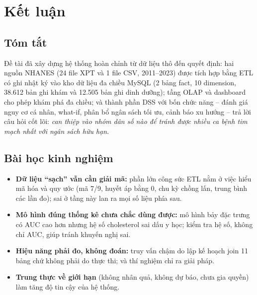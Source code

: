 \chapter{Kết luận}\label{ch:conclusion}

\section{Tóm tắt}
Đề tài đã xây dựng hệ thống hoàn chỉnh từ dữ liệu thô đến quyết định: hai nguồn NHANES (24 file XPT và 1 file CSV, 2011--2023) được tích hợp bằng ETL có ghi nhật ký vào kho dữ liệu đa chiều MySQL (2 bảng fact, 10 dimension, 38.612 bản ghi khám và 12.505 bản ghi dinh dưỡng); tầng OLAP và dashboard cho phép khám phá đa chiều; và thành phần DSS với bốn chức năng -- đánh giá nguy cơ cá nhân, what-if, phân bổ ngân sách tối ưu, cảnh báo xu hướng -- trả lời câu hỏi cốt lõi: \emph{can thiệp vào nhóm dân số nào để tránh được nhiều ca bệnh tim mạch nhất với ngân sách hữu hạn}.

\section{Bài học kinh nghiệm}
\begin{itemize}
\item \textbf{Dữ liệu ``sạch'' vẫn cần giải mã:} phần lớn công sức ETL nằm ở việc hiểu mã hóa và quy ước (mã 7/9, huyết áp bằng 0, chu kỳ chồng lấn, trung bình các lần đo); sai ở tầng này lan ra mọi số liệu phía sau.
\item \textbf{Mô hình đúng thống kê chưa chắc dùng được:} mô hình bảy đặc trưng có AUC cao hơn nhưng hệ số cholesterol sai dấu y học; kiểm tra hệ số, không chỉ AUC, giúp tránh khuyến nghị sai.
\item \textbf{Hiệu năng phải đo, không đoán:} truy vấn chậm do lập kế hoạch join 11 bảng chứ không phải do thực thi;  và thí nghiệm chỉ ra giải pháp.
\item \textbf{Trung thực về giới hạn} (không nhân quả, không dự báo, chưa gia quyền) làm tăng độ tin cậy của hệ thống.
\end{itemize}

